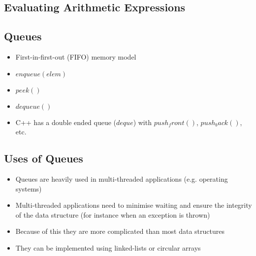 \begin{slide}
\section{Evaluating Arithmetic Expressions}

\pausebuild
\begin{center}
    \pause
\end{center}
\end{slide}



\Outline


\begin{slide}
\section{Queues}

\pausebuild
\begin{itemize}
\item First-in-first-out (FIFO) memory model \pause
\item \jl$enqueue(elem)$\pause
\item \jl$peek()$\pause
\item \jl$dequeue()$\pause
\item C++ has a double ended queue (\jl$deque$) with
  \jl$push_front()$, \jl$push_back()$, etc.\pause
\end{itemize}
\begin{center}
  \pause
\end{center}
\end{slide}


\begin{slide}
\section{Uses of Queues}

\begin{PauseHighLight}
  \begin{itemize}
  \item Queues are heavily used in multi-threaded applications
    (e.g. operating systems)\pause
  \item Multi-threaded applications need to minimise waiting and
    ensure the integrity of the data structure (for instance when an
    exception is thrown)\pause
  \item Because of this they are more complicated than most data
    structures\pause
  \item They can be implemented using linked-lists or circular
    arrays\pause
  \end{itemize}
\end{PauseHighLight}
\end{slide}




